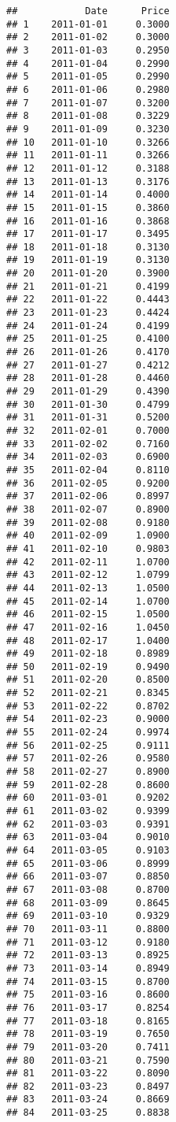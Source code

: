 \documentclass[
]{article}
\begin{document}
\begin{verbatim}
##            Date      Price
## 1    2011-01-01     0.3000
## 2    2011-01-02     0.3000
## 3    2011-01-03     0.2950
## 4    2011-01-04     0.2990
## 5    2011-01-05     0.2990
## 6    2011-01-06     0.2980
## 7    2011-01-07     0.3200
## 8    2011-01-08     0.3229
## 9    2011-01-09     0.3230
## 10   2011-01-10     0.3266
## 11   2011-01-11     0.3266
## 12   2011-01-12     0.3188
## 13   2011-01-13     0.3176
## 14   2011-01-14     0.4000
## 15   2011-01-15     0.3860
## 16   2011-01-16     0.3868
## 17   2011-01-17     0.3495
## 18   2011-01-18     0.3130
## 19   2011-01-19     0.3130
## 20   2011-01-20     0.3900
## 21   2011-01-21     0.4199
## 22   2011-01-22     0.4443
## 23   2011-01-23     0.4424
## 24   2011-01-24     0.4199
## 25   2011-01-25     0.4100
## 26   2011-01-26     0.4170
## 27   2011-01-27     0.4212
## 28   2011-01-28     0.4460
## 29   2011-01-29     0.4390
## 30   2011-01-30     0.4799
## 31   2011-01-31     0.5200
## 32   2011-02-01     0.7000
## 33   2011-02-02     0.7160
## 34   2011-02-03     0.6900
## 35   2011-02-04     0.8110
## 36   2011-02-05     0.9200
## 37   2011-02-06     0.8997
## 38   2011-02-07     0.8900
## 39   2011-02-08     0.9180
## 40   2011-02-09     1.0900
## 41   2011-02-10     0.9803
## 42   2011-02-11     1.0700
## 43   2011-02-12     1.0799
## 44   2011-02-13     1.0500
## 45   2011-02-14     1.0700
## 46   2011-02-15     1.0500
## 47   2011-02-16     1.0450
## 48   2011-02-17     1.0400
## 49   2011-02-18     0.8989
## 50   2011-02-19     0.9490
## 51   2011-02-20     0.8500
## 52   2011-02-21     0.8345
## 53   2011-02-22     0.8702
## 54   2011-02-23     0.9000
## 55   2011-02-24     0.9974
## 56   2011-02-25     0.9111
## 57   2011-02-26     0.9580
## 58   2011-02-27     0.8900
## 59   2011-02-28     0.8600
## 60   2011-03-01     0.9202
## 61   2011-03-02     0.9399
## 62   2011-03-03     0.9391
## 63   2011-03-04     0.9010
## 64   2011-03-05     0.9103
## 65   2011-03-06     0.8999
## 66   2011-03-07     0.8850
## 67   2011-03-08     0.8700
## 68   2011-03-09     0.8645
## 69   2011-03-10     0.9329
## 70   2011-03-11     0.8800
## 71   2011-03-12     0.9180
## 72   2011-03-13     0.8925
## 73   2011-03-14     0.8949
## 74   2011-03-15     0.8700
## 75   2011-03-16     0.8600
## 76   2011-03-17     0.8254
## 77   2011-03-18     0.8165
## 78   2011-03-19     0.7650
## 79   2011-03-20     0.7411
## 80   2011-03-21     0.7590
## 81   2011-03-22     0.8090
## 82   2011-03-23     0.8497
## 83   2011-03-24     0.8669
## 84   2011-03-25     0.8838

\end{verbatim}
\end{document}
